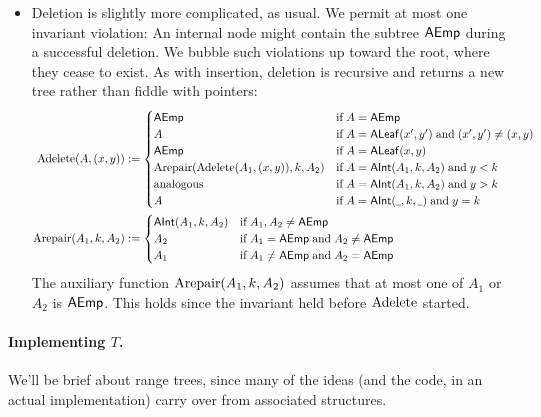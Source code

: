 \documentclass[a4paper]{article}
\newcommand{\any}{{\rule[-.2ex]{1ex}{.4pt}}}	%
\begin{document}
\begin{itemize}
\item Deletion is slightly more complicated, as usual.
We permit at most one invariant violation:
An internal node might contain the subtree $\mathsf{AEmp}$ during a successful deletion.
We bubble such violations up toward the root, where they cease to exist.
As with insertion, deletion is recursive and returns a new tree rather than fiddle with pointers:
\begin{align*}
	\Adelete(A, (x,y)) &:= \begin{cases}
		\AEMP	&\IF A = \AEMP \\
		A	&\IF A = \ALEAF(x',y') \AND (x',y') \not= (x,y) \\
		\AEMP	&\IF A = \ALEAF(x,y) \\
		\Arepair(\Adelete(A_1, (x,y)), k, A_2)	&\IF A = \AINT(A_1, k, A_2) \AND y < k \\
		\text{analogous}	&\IF A = \AINT(A_1, k, A_2) \AND y > k \\
		A	&\IF A = \AINT(\any, k, \any) \AND y = k
	\end{cases} \\
	\Arepair(A_1, k, A_2) &:= \begin{cases}
		\AINT(A_1, k, A_2)	&\IF A_1, A_2 \not= \AEMP \\
		A_2	&\IF A_1 = \AEMP \AND A_2 \not= \AEMP \\
		A_1	&\IF A_1 \not= \AEMP \AND A_2 = \AEMP \\
	\end{cases}
\end{align*}
The auxiliary function $\text{Arepair}(A_1, k, A_2)$ assumes that at most one of $A_1$ or $A_2$ is $\mathsf{AEmp}$.
This holds since the invariant held before $\text{Adelete}$ started.

\end{itemize}

\paragraph{Implementing $T$.}
\newcommand{\TEMP}{\mathsf{TEmp}}%
\newcommand{\TINT}{\mathsf{TInt}}%
\newcommand{\TLEAF}{\mathsf{TLeaf}}%
\newcommand{\Tinsert}{\text{Tinsert}}%
\newcommand{\Tdelete}{\text{Tdelete}}%
\newcommand{\Trepair}{\text{Trepair}}%
\newcommand{\Tkey}{\text{Tkey}}%
We'll be brief about range trees, since many of the ideas (and the code, in an actual implementation) carry over from associated structures.
\end{document}
